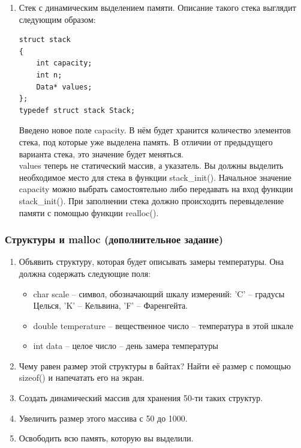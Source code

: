 \documentclass{article}
\begin{document}
\begin{enumerate}
\item Стек с динамическим выделением памяти. Описание такого стека выглядит следующим образом:
\begin{verbatim}
struct stack
{
    int capacity;
    int n;
    Data* values;
};
typedef struct stack Stack;
\end{verbatim}
Введено новое поле capacity. В нём будет хранится количество элементов стека, под которые уже выделена память. В отличии от предыдущего варианта стека, это значение будет меняться. \\
values теперь не статический массив, а указатель. Вы должны выделить необходимое место для стека в функции stack\_init(). Начальное значение capacity можно выбрать самостоятельно либо передавать на вход функции stack\_init(). При заполнении стека должно происходить перевыделение памяти с помощью функции realloc().
\end{enumerate}


\subsubsection*{Структуры и malloc (дополнительное задание)} 
\begin{enumerate}
\item Объявить структуру, которая будет описывать замеры температуры. Она должна содержать следующие поля: 
\begin{itemize}
\item char scale -- символ, обозначающий шкалу измерений: 'C' -- градусы Целься, 'K' -- Кельвина, 'F' -- Фаренгейта.
\item double temperature -- вещественное число -- температура в этой шкале
\item int data -- целое число -- день замера температуры
\end{itemize}
\item Чему равен размер этой структуры в байтах? Найти её размер с помощью sizeof() и напечатать его на экран.
\item Создать динамический массив для хранения 50-ти таких структур.
\item Увеличить размер этого массива с 50 до 1000.
\item Освободить всю память, которую вы выделили.
\end{enumerate}
\end{document}
